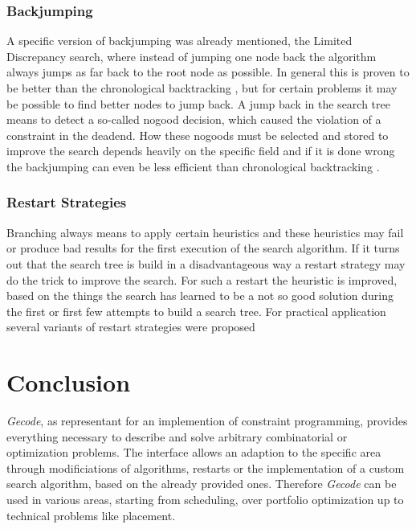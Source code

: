 \documentclass[10pt,
               a4paper,
               journal,
               ]{IEEEtran}
\begin{document}
	\subsubsection{Backjumping}
	A specific version of backjumping was already mentioned, the Limited Discrepancy search, where instead of jumping one node back the algorithm always jumps as far back to the root node as possible. In general this is proven to be better than the chronological backtracking \cite{limitedDiscrepancy}, but for certain problems it may be possible to find better nodes to jump back. A jump back in the search tree means to detect a so-called nogood decision, which caused the violation of a constraint in the deadend. How these nogoods must be selected and stored to improve the search depends heavily on the specific field and if it is done wrong the backjumping can even be less efficient than chronological backtracking \cite[p.~100]{handbookCP}.
	
	\subsubsection{Restart Strategies}
	Branching always means to apply certain heuristics and these heuristics may fail or produce bad results for the first execution of the search algorithm. If it turns out that the search tree is build in a disadvantageous way a restart strategy may do the trick to improve the search. For such a restart the heuristic is improved, based on the things the search has learned to be a not so good solution during the first or first few attempts to build a search tree.
	For practical application several variants of restart strategies were proposed \cite[p.~113]{handbookCP}
	
	\section{Conclusion}
	\emph{Gecode}, as representant for an implemention of constraint programming, provides everything necessary to describe and solve arbitrary combinatorial or optimization problems. The interface allows an adaption to the specific area through modificiations of algorithms, restarts or the implementation of a custom search algorithm, based on the already provided ones. Therefore \emph{Gecode} can be used in various areas, starting from scheduling, over portfolio optimization up to technical problems like placement.
	
\end{document}
